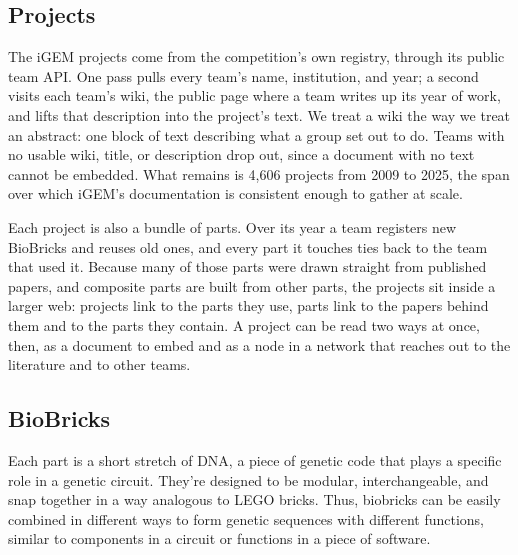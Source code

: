 \documentclass[12pt,a4paper]{article}
\begin{document}
	\subsection{Projects}
	The iGEM projects come from the competition's own registry, through its public team API. One pass pulls every team's name, institution, and year; a second visits each team's wiki, the public page where a team writes up its year of work, and lifts that description into the project's text. We treat a wiki the way we treat an abstract: one block of text describing what a group set out to do. Teams with no usable wiki, title, or description drop out, since a document with no text cannot be embedded. What remains is 4,606 projects from 2009 to 2025, the span over which iGEM's documentation is consistent enough to gather at scale. 
	
	Each project is also a bundle of parts. Over its year a team registers new BioBricks and reuses old ones, and every part it touches ties back to the team that used it. Because many of those parts were drawn straight from published papers, and composite parts are built from other parts, the projects sit inside a larger web: projects link to the parts they use, parts link to the papers behind them and to the parts they contain. A project can be read two ways at once, then, as a document to embed and as a node in a network that reaches out to the literature and to other teams.
	
	
	\subsection{BioBricks}
	Each part is a short stretch of DNA, a piece of genetic code that plays a specific role in a genetic circuit. They're designed to be modular, interchangeable, and snap together in a way analogous to LEGO bricks. Thus, biobricks can be easily combined in different ways to form genetic sequences with different functions, similar to components in a circuit or functions in a piece of software.
	
\end{document}
